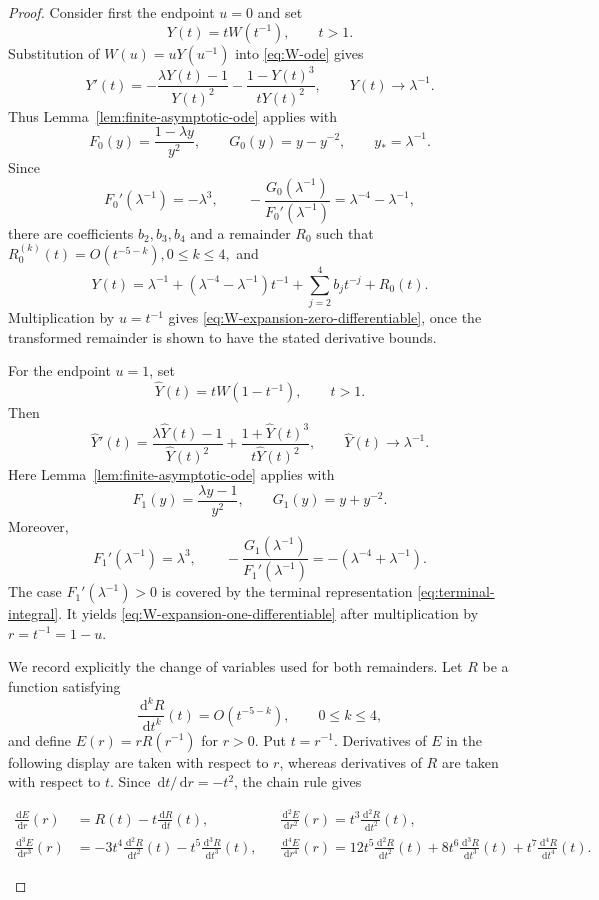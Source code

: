 \documentclass[12pt]{amsart}
\numberwithin{equation}{section}
\theoremstyle{plain}
\theoremstyle{definition}
\newcommand{\dd}{\,\mathrm d}
\begin{document}
\begin{proof}
Consider first the endpoint $u=0$ and set
\[
 Y(t)=tW(t^{-1}),
 \qquad t>1.
\]
Substitution of $W(u)=uY(u^{-1})$ into \eqref{eq:W-ode} gives
\begin{equation*}
 Y'(t)=-\frac{\lambda Y(t)-1}{Y(t)^2}
       -\frac{1-Y(t)^3}{tY(t)^2},
 \qquad
 Y(t)\longrightarrow \lambda^{-1}.
\end{equation*}
Thus Lemma~\ref{lem:finite-asymptotic-ode} applies with
\[
 F_0(y)=\frac{1-\lambda y}{y^2},
 \qquad
 G_0(y)=y-y^{-2},
 \qquad
 y_*=\lambda^{-1}.
\]
Since
\[
 F_0'(\lambda^{-1})=-\lambda^3,
 \qquad
 -\frac{G_0(\lambda^{-1})}{F_0'(\lambda^{-1})}
 =\lambda^{-4}-\lambda^{-1},
\]
there are coefficients $b_2,b_3,b_4$ and a remainder $R_0$ such that
\(
 R_0^{(k)}(t)=O(t^{-5-k}),
 0\le k\le4,
\)
and
\[
 Y(t)=\lambda^{-1}
 +\left(\lambda^{-4}-\lambda^{-1}\right)t^{-1}
 +\sum_{j=2}^4b_jt^{-j}+R_0(t).
\]
Multiplication by $u=t^{-1}$ gives
\eqref{eq:W-expansion-zero-differentiable}, once the transformed remainder
is shown to have the stated derivative bounds.

For the endpoint $u=1$, set
\[
 \widehat Y(t)=tW(1-t^{-1}),
 \qquad t>1.
\]
Then
\begin{equation*}
 \widehat Y'(t)=\frac{\lambda\widehat Y(t)-1}{\widehat Y(t)^2}
 +\frac{1+\widehat Y(t)^3}{t\widehat Y(t)^2},
 \qquad
 \widehat Y(t)\longrightarrow\lambda^{-1}.
\end{equation*}
Here Lemma~\ref{lem:finite-asymptotic-ode} applies with
\[
 F_1(y)=\frac{\lambda y-1}{y^2},
 \qquad
 G_1(y)=y+y^{-2}.
\]
Moreover,
\[
 F_1'(\lambda^{-1})=\lambda^3,
 \qquad
 -\frac{G_1(\lambda^{-1})}{F_1'(\lambda^{-1})}
 =-(\lambda^{-4}+\lambda^{-1}).
\]
The case $F_1'(\lambda^{-1})>0$ is covered by the terminal representation
\eqref{eq:terminal-integral}.  It yields
\eqref{eq:W-expansion-one-differentiable} after multiplication by
$r=t^{-1}=1-u$.

We record explicitly the change of variables used for both remainders.  Let
$R$ be a function satisfying
\[
 \frac{\dd^kR}{\dd t^k}(t)=O(t^{-5-k}),
 \qquad 0\le k\le4,
\]
and define $E(r)=rR(r^{-1})$ for $r>0$.  Put $t=r^{-1}$.
Derivatives of $E$ in the following display are taken with respect to $r$,
whereas derivatives of $R$ are taken with respect to $t$.  Since
$\dd t/\dd r=-t^2$, the chain rule gives
\begin{samepage}
 \begin{align*}
  \frac{\dd E}{\dd r}(r)&=R(t)-t\frac{\dd R}{\dd t}(t),
 &&\frac{\dd^2E}{\dd r^2}(r)=t^3\frac{\dd^2R}{\dd t^2}(t), \\
  \frac{\dd^3E}{\dd r^3}(r)&=-3t^4\frac{\dd^2R}{\dd t^2}(t)-t^5\frac{\dd^3R}{\dd t^3}(t),
  &&\frac{\dd^4E}{\dd r^4}(r)=12t^5\frac{\dd^2R}{\dd t^2}(t)+8t^6\frac{\dd^3R}{\dd t^3}(t)+t^7\frac{\dd^4R}{\dd t^4}(t).
\end{align*}
\end{samepage}


\end{proof}
\end{document}
